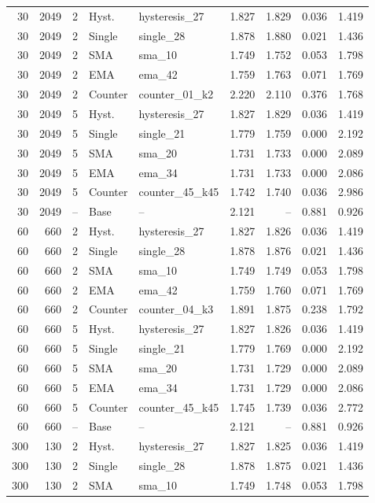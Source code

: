 {\begin{longtable}{rrlllrrrr}
30 & 2049 & 2 & Hyst. & hysteresis\_27 & 1.827 & 1.829 & 0.036 & 1.419\\
30 & 2049 & 2 & Single & single\_28 & 1.878 & 1.880 & 0.021 & 1.436\\
30 & 2049 & 2 & SMA & sma\_10 & 1.749 & 1.752 & 0.053 & 1.798\\
30 & 2049 & 2 & EMA & ema\_42 & 1.759 & 1.763 & 0.071 & 1.769\\
30 & 2049 & 2 & Counter & counter\_01\_k2 & 2.220 & 2.110 & 0.376 & 1.768\\
30 & 2049 & 5 & Hyst. & hysteresis\_27 & 1.827 & 1.829 & 0.036 & 1.419\\
30 & 2049 & 5 & Single & single\_21 & 1.779 & 1.759 & 0.000 & 2.192\\
30 & 2049 & 5 & SMA & sma\_20 & 1.731 & 1.733 & 0.000 & 2.089\\
30 & 2049 & 5 & EMA & ema\_34 & 1.731 & 1.733 & 0.000 & 2.086\\
30 & 2049 & 5 & Counter & counter\_45\_k45 & 1.742 & 1.740 & 0.036 & 2.986\\
30 & 2049 & -- & Base & -- & 2.121 & -- & 0.881 & 0.926\\
60 & 660 & 2 & Hyst. & hysteresis\_27 & 1.827 & 1.826 & 0.036 & 1.419\\
60 & 660 & 2 & Single & single\_28 & 1.878 & 1.876 & 0.021 & 1.436\\
60 & 660 & 2 & SMA & sma\_10 & 1.749 & 1.749 & 0.053 & 1.798\\
60 & 660 & 2 & EMA & ema\_42 & 1.759 & 1.760 & 0.071 & 1.769\\
60 & 660 & 2 & Counter & counter\_04\_k3 & 1.891 & 1.875 & 0.238 & 1.792\\
60 & 660 & 5 & Hyst. & hysteresis\_27 & 1.827 & 1.826 & 0.036 & 1.419\\
60 & 660 & 5 & Single & single\_21 & 1.779 & 1.769 & 0.000 & 2.192\\
60 & 660 & 5 & SMA & sma\_20 & 1.731 & 1.729 & 0.000 & 2.089\\
60 & 660 & 5 & EMA & ema\_34 & 1.731 & 1.729 & 0.000 & 2.086\\
60 & 660 & 5 & Counter & counter\_45\_k45 & 1.745 & 1.739 & 0.036 & 2.772\\
60 & 660 & -- & Base & -- & 2.121 & -- & 0.881 & 0.926\\
300 & 130 & 2 & Hyst. & hysteresis\_27 & 1.827 & 1.825 & 0.036 & 1.419\\
300 & 130 & 2 & Single & single\_28 & 1.878 & 1.875 & 0.021 & 1.436\\
300 & 130 & 2 & SMA & sma\_10 & 1.749 & 1.748 & 0.053 & 1.798\\

\end{longtable}}
